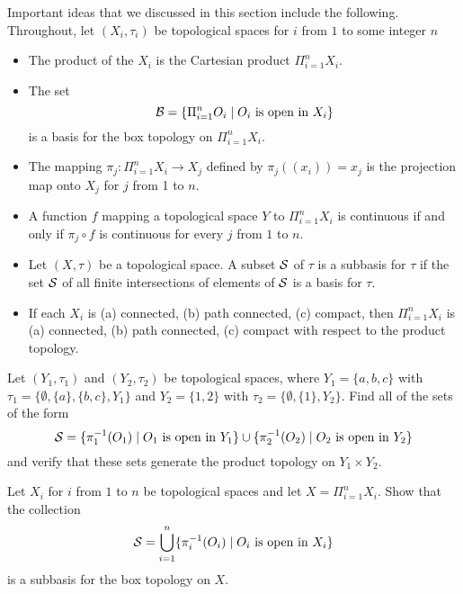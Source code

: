 Important ideas that we discussed in this section include the following. Throughout, let $(X_i, \tau_i)$ be topological spaces for $i$ from $1$ to some integer $n$
\begin{itemize}
\item The product of the $X_i$ is the Cartesian product $\Pi_{i=1}^n X_i$. 
\item The set 
\[\mathcal{B} = \left\{ \Pi_{i=1}^n O_i \mid O_i \text{ is open in } X_i\right\}\]
 is a basis for the box topology on $\Pi_{i=1}^n X_i$. 
\item The mapping $\pi_j : \Pi_{i=1}^n X_i \to X_j$ defined by $\pi_j((x_i)) = x_j$ is the projection map onto $X_j$ for $j$ from 1 to $n$. 
\item A function $f$ mapping a topological space $Y$ to $\Pi_{i=1}^n X_i$ is continuous if and only if $\pi_j \circ f$ is continuous for every $j$ from $1$ to $n$. 
\item Let $(X, \tau)$ be a topological space. A subset $\mathcal{S}$ of $\tau$ is a subbasis for $\tau$ if the set $\mathcal{S}$ of all finite intersections of elements of $\mathcal{S}$ is a basis for $\tau$. 
\item If each $X_i$ is (a) connected, (b) path connected, (c) compact, then $\Pi_{i=1}^n X_i$ is (a) connected, (b) path connected, (c) compact with respect to the product topology.
\end{itemize}


\be

\item \label{ex:subbasis}
\ba

\item Let $(Y_1, \tau_1)$ and $(Y_2, \tau_2)$ be topological spaces, where $Y_1 = \{a,b,c\}$ with $\tau_1 = \{\emptyset, \{a\}, \{b,c\}, Y_1\}$ and $Y_2 = \{1,2\}$ with $\tau_2 = \{\emptyset, \{1\}, Y_2\}$. Find all of the sets of the form 
\[\mathcal{S} = \{\pi_1^{-1}(O_1) \mid O_1 \text{ is open in } Y_1\} \cup \{\pi_2^{-1}(O_2) \mid O_2 \text{ is open in } Y_2\}\]
and verify that these sets generate the product topology on $Y_1 \times Y_2$. 

\item Let $X_{i}$ for $i$ from $1$ to $n$ be topological spaces and let $X = \Pi_{i=1}^n X_i$. Show that the collection
\[\mathcal{S} = \bigcup_{i=1}^n \{\pi_i^{-1}(O_i) \mid O_i \text{ is open in } X_i\}\]
is a subbasis for the box topology on $X$. 

\ea

